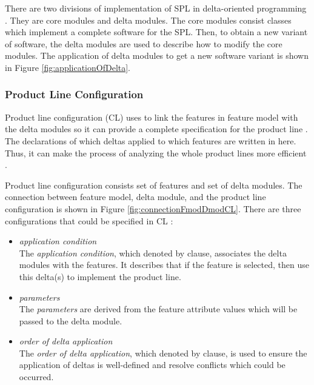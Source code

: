 There are two divisions of implementation of SPL in delta-oriented programming \citep{paper.clarke.variability,paper.johnsen2014.deploymentVariabilityinDeltaOriented}. They are core modules and delta modules. The core modules consist classes which implement a complete software for the SPL. Then, to obtain a new variant of software, the delta modules are used to describe how to modify the core modules. The application of delta modules to get a new software variant is shown in Figure \ref{fig:applicationOfDelta}.

\subsubsection{Product Line Configuration}\label{ProductLineConf}
Product line configuration (CL) uses to link the features in feature model with the delta modules so it can provide a complete specification for the product line \citep{paper.clarke.variability,paper.hanle.ABStutorial,paper.johnsen2014.deploymentVariabilityinDeltaOriented}. The declarations of which deltas applied to which features are written in here. Thus, it can make the process of analyzing the whole product lines more efficient \citep{paper.hanle.ABStutorial}.

Product line configuration consists set of features and set of delta modules. The connection between feature model, delta module, and the product line configuration is shown in Figure \ref{fig:connectionFmodDmodCL}. There are three configurations that could be specified in CL \citep{paper.hanle.ABStutorial,paper.johnsen2014.deploymentVariabilityinDeltaOriented}:
\begin{itemize}
	\item \textit{application condition} \\
	The \textit{application condition}, which denoted by  clause, associates the delta modules with the features. It describes that if the feature is selected, then use this delta(s) to implement the product line.
	
	\item \textit{parameters} \\
	The \textit{parameters} are derived from the feature attribute values which will be passed to the delta module.
	
	\item \textit{order of delta application} \\
	The \textit{order of delta application}, which denoted by  clause, is used to ensure the application of deltas is well-defined and resolve conflicts which could be occurred.
\end{itemize}

